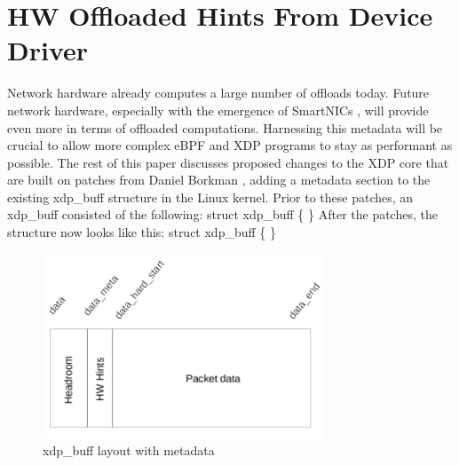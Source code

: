 \documentclass[letterpaper]{article}
\begin{document}
\section{HW Offloaded Hints From Device Driver} 

Network hardware already computes a large number of offloads today. Future network hardware, especially with the emergence of SmartNICs \cite{smartnic2016}, will provide even more in terms of offloaded computations. Harnessing this metadata will be crucial to allow more complex eBPF and XDP programs to stay as performant as possible.
\newline
\newline
The rest of this paper discusses proposed changes to the XDP core that are built on patches from Daniel Borkman \cite{borkmann2017}, adding a metadata section to the existing xdp\_buff structure in the Linux kernel. Prior to these patches, an xdp\_buff consisted of the following:
\newline
\newline
struct xdp\_buff \{
\newline
{}
\newline
{}
\newline
{}
\newline
\}
\newline
\newline
After the patches, the structure now looks like this:
\newline
\newline
struct xdp\_buff \{
\newline
{}
\newline
{}
\newline
{}
\newline
{}
\newline
\}
\newline

\begin{figure}[h]
\includegraphics[width=3.31in]{xdp-metadata-layout.png}
\caption{xdp\_buff layout with metadata}
\label{xdp-metadata-layout}
\end{figure}
\end{document}

